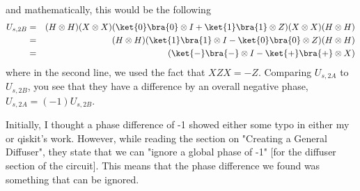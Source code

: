 \documentclass[preprint,aps,prd,nofootinbib,superscriptaddress]{revtex4-2}
\begin{document}
%
and mathematically, this would be the following
%
\begin{eqnarray}
U_{s,2B} &=& (H \otimes H)(X \otimes X)(\ket{0}\bra{0} \otimes I + \ket{1}\bra{1} \otimes Z)(X \otimes X)(H \otimes H)
\nonumber \\
&=& (H \otimes H)(\ket{1}\bra{1} \otimes I - \ket{0}\bra{0} \otimes Z)(H \otimes H)
\nonumber \\
&=& (\ket{-}\bra{-} \otimes I - \ket{+}\bra{+} \otimes X)
\end{eqnarray}
%
where in the second line, we used the fact that $XZX = -Z$. Comparing $U_{s,2A}$ to $U_{s,2B}$, you see that they have a difference by an overall negative phase, $U_{s,2A} = (-1)U_{s,2B}$. 
%

%
Initially, I thought a phase difference of -1 showed either some typo in either my or qiskit's work. However, while reading the section on "Creating a General Diffuser", they state that we can "ignore a global phase of -1" [for the diffuser section of the circuit]. This means that the phase difference we found was something that can be ignored. 



\begin{thebibliography}{99}



\end{thebibliography}
\end{document}
